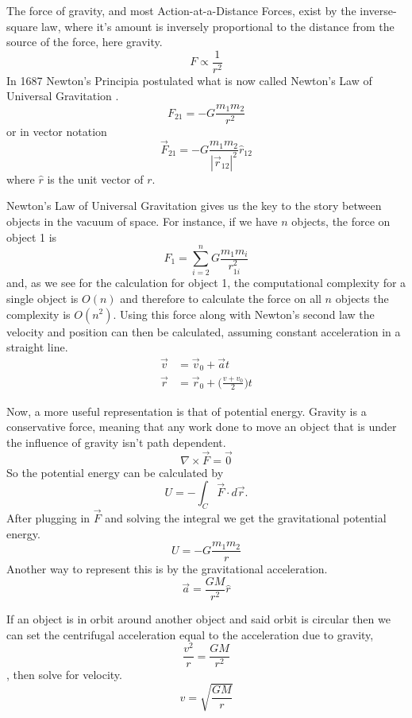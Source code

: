 The force of gravity, and most Action-at-a-Distance Forces, exist by the inverse-square law, where it's amount is inversely proportional to the distance from the source of the force, here gravity. $$F\propto \frac{1}{r^2}$$ In 1687 Newton's Principia postulated what is now called Newton's Law of Universal Gravitation \cite{rohrlich_1999}. $$F_{21}=-G\frac{m_1m_2}{r^2}$$ or in vector notation 
\begin{equation}
\vec{F}_{21}=-G\frac{m_1m_2}{|\vec{r}_{12}|^2}\hat{r}_{12}
\end{equation}
 where $\hat{r}$ is the unit vector of $r$.

Newton's Law of Universal Gravitation gives us the key to the story between objects in the vacuum of space. For instance, if we have $n$ objects, the force on object 1 is $$F_1=\sum_{i=2}^n{G\frac{m_1 m_i}{r_{1i}^2}}$$ and, as we see for the calculation for object 1, the computational complexity for a single object is $O(n)$ and therefore to calculate the force on all $n$ objects the complexity is $O(n^2)$. Using this force along with Newton's second law the velocity and position can then be calculated, assuming constant acceleration in a straight line.
\begin{align}
	\vec{v} &= \vec{v}_0+\vec{a}t \label{eq:vel}\\
	\vec{r} &= \vec{r}_0+\Big(\frac{v+v_0}{2}\Big)t\label{eq:pos}
\end{align}

Now, a more useful representation is that of potential energy. Gravity is a conservative force, meaning that any work done to move an object that is under the influence of gravity isn't path dependent. $$\nabla\times \vec{F}=\vec{0}$$ 
So the potential energy can be calculated by $$U=-\int_C \vec{F}\cdot d\vec{r}.$$ After plugging in $\vec{F}$ and solving the integral we get the gravitational potential energy.
\begin{equation} \label{eq:gravpotential}
U=-G\frac{m_1m_2}{r}
\end{equation}
Another way to represent this is by the gravitational acceleration. 
\begin{equation}
\vec{a}=\frac{GM}{r^2}\hat{r}
\end{equation}

If an object is in orbit around another object and said orbit is circular then we can set the centrifugal acceleration equal to the acceleration due to gravity, $$\frac{v^2}{r}=\frac{GM}{r^2}$$, then solve for velocity.
\begin{equation}
v=\sqrt{\frac{GM}{r}}
\end{equation}


